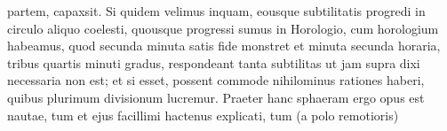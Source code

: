 partem,\hspace{1pt}   capax\pend\pstart\noindent sit. Si quidem velimus inquam, eousque subtilitatis progredi in circulo aliquo coelesti, quousque progressi sumus in Horologio\protect{}, cum horologium\protect{} habeamus, quod secunda minuta satis fide monstret et minuta secunda horaria, tribus quartis minuti gradus, respondeant tanta subtilitas ut jam supra dixi necessaria non est; et si esset, possent commode nihilominus rationes haberi, quibus plurimum divisionum lucremur. Praeter hanc sphaeram ergo opus est nautae, tum et  ejus facillimi hactenus explicati, tum  (a polo remotioris) 